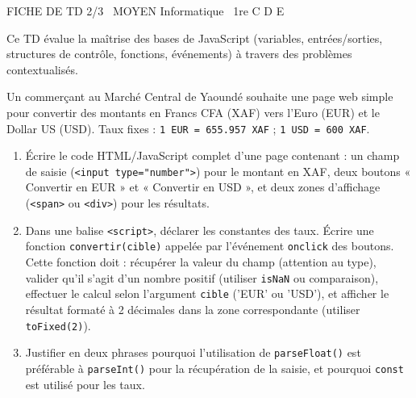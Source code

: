 \documentclass[11pt]{article}
\begin{document}
\begin{tcolorbox}[enhanced,colback=popink,colframe=popink,arc=10pt,boxrule=0pt,left=12pt,right=12pt,top=9pt,bottom=9pt]
{\color{white}\popxbold\small FICHE DE TD 2/3 \textbullet\ MOYEN \hfill Informatique \textbullet\ 1re C D E\par}
\end{tcolorbox}
\vspace{4pt}
Ce TD évalue la maîtrise des bases de JavaScript (variables, entrées/sorties, structures de contrôle, fonctions, événements) à travers des problèmes contextualisés.

\begin{exercice}
Un commerçant au Marché Central de Yaoundé souhaite une page web simple pour convertir des montants en Francs CFA (XAF) vers l'Euro (EUR) et le Dollar US (USD). Taux fixes : \texttt{1 EUR = 655.957 XAF} ; \texttt{1 USD = 600 XAF}.
\begin{enumerate}
    \item Écrire le code HTML/JavaScript complet d'une page contenant : un champ de saisie (\texttt{<input type="number">}) pour le montant en XAF, deux boutons « Convertir en EUR » et « Convertir en USD », et deux zones d'affichage (\texttt{<span>} ou \texttt{<div>}) pour les résultats.
    \item Dans une balise \texttt{<script>}, déclarer les constantes des taux. Écrire une fonction \texttt{convertir(cible)} appelée par l'événement \texttt{onclick} des boutons. Cette fonction doit : récupérer la valeur du champ (attention au type), valider qu'il s'agit d'un nombre positif (utiliser \texttt{isNaN} ou comparaison), effectuer le calcul selon l'argument \texttt{cible} ('EUR' ou 'USD'), et afficher le résultat formaté à 2 décimales dans la zone correspondante (utiliser \texttt{toFixed(2)}).
    \item Justifier en deux phrases pourquoi l'utilisation de \texttt{parseFloat()} est préférable à \texttt{parseInt()} pour la récupération de la saisie, et pourquoi \texttt{const} est utilisé pour les taux.
\end{enumerate}
\end{exercice}
\end{document}
